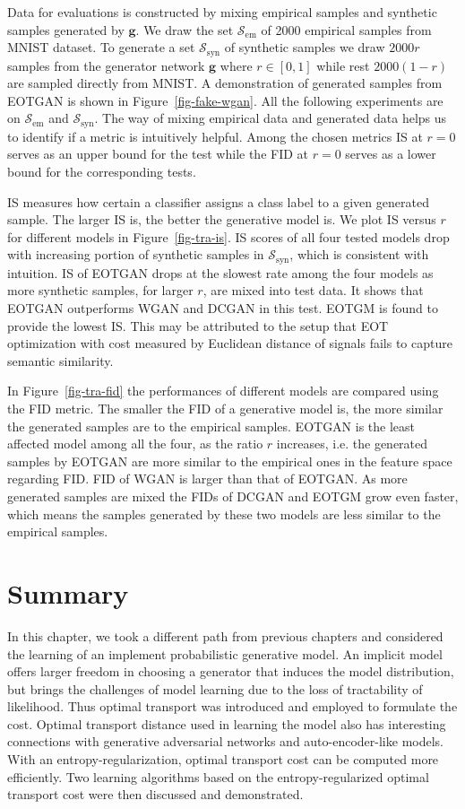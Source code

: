 Data for evaluations is constructed by mixing empirical samples and
synthetic samples generated by $\bm{g}$. We draw the set $\mathcal{S}_{\mathrm{em}}$ of 2000 empirical samples from MNIST dataset. To generate a set $\mathcal{S}_{\mathrm{syn}}$ of synthetic
samples we draw $2000r$ samples from the generator network $\bm{g}$ where
$r\in[0,1]$ while rest $2000(1-r)$ are sampled directly from
MNIST. A demonstration of generated samples from EOTGAN is shown in Figure~\ref{fig-fake-wgan}.
All the following experiments are on
$\mathcal{S}_{\mathrm{em}}$ and $\mathcal{S}_{\mathrm{syn}}$. 
The way of mixing empirical data and generated data helps
us to identify if a metric is intuitively helpful. Among the chosen metrics IS at $r=0$ serves as an upper bound for the test while the FID at $r=0$ serves as a lower bound for the corresponding tests. 

IS measures how certain a classifier assigns a class label to a given
generated sample. The larger IS is, the better the generative model
is. We plot IS versus $r$ for different models in
Figure~\ref{fig-tra-is}. IS scores of all four tested models drop with
increasing portion of synthetic samples in
$\mathcal{S}_{\mathrm{syn}}$, which is consistent with intuition. IS
of EOTGAN drops at the slowest rate among the four models as more
synthetic samples, for larger $r$, are mixed into test data. It shows
that EOTGAN outperforms WGAN and DCGAN in this test. EOTGM is found to provide the lowest IS.
This may be attributed to the setup that 
EOT optimization with cost measured by Euclidean distance of signals
fails to capture semantic similarity.

In Figure~\ref{fig-tra-fid} the performances of different models are
compared using the FID metric. The smaller the FID of a generative model is, the more similar the
generated samples are to the empirical samples. EOTGAN is the least affected model among all the four, as the ratio $r$ increases, i.e. the generated samples by EOTGAN are more similar to the empirical
ones in the feature space regarding FID. FID of WGAN is larger than that of EOTGAN. As
more generated samples are mixed the FIDs of DCGAN and EOTGM grow
even faster, which means the samples generated by these two models are
less similar to the empirical samples.

\section{Summary}
In this chapter, we took a different path from previous chapters and considered the learning of an implement probabilistic generative model. An implicit model offers larger freedom in choosing a generator that induces the model distribution, but brings the challenges of model learning due to the loss of tractability of likelihood. Thus optimal transport was introduced and employed to formulate the cost. Optimal transport distance used in learning the model also has interesting connections with generative adversarial networks and auto-encoder-like models. With an entropy-regularization, optimal transport cost can be computed more efficiently. Two learning algorithms based on the entropy-regularized optimal transport cost were then discussed and demonstrated. 


